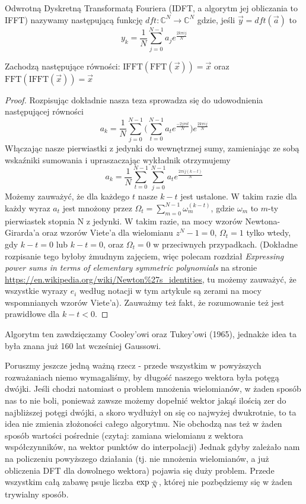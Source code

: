 \begin{definition}
    Odwrotną Dyskretną Transformatą Fouriera (IDFT, a algorytm jej obliczania to IFFT) nazywamy następującą funkcję $dft: \mathbb{C}^N \rightarrow \mathbb{C}^N$
    gdzie, jeśli $\vec{y} = dft(\vec{a})$ to $$y_k = \frac{1}{N}\sum_{j=0}^{N-1}a_je^{\frac{2k\pi ij}{N}}$$
\end{definition}

\begin{observation_small}
    Zachodzą następujące równości: $\text{IFFT}(\text{FFT}(\vec{x})) = \vec{x}$ oraz $\text{FFT}(\text{IFFT}(\vec{x})) = \vec{x}$
\end{observation_small}
\begin{proof}
    Rozpisując dokładnie nasza teza sprowadza się do udowodnienia następującej równości $$a_k = \frac{1}{N}\sum_{j=0}^{N-1}\Big(\sum_{t=0}^{N-1} a_t e^{\frac{-2j\pi i t}{N}} \Big) e^{\frac{2k\pi i j}{N}}$$
    Włączając nasze pierwiastki z jedynki do wewnętrznej sumy, zamieniając ze sobą wskaźniki sumowania i upraszaczając wykładnik otrzymujemy
    $$a_k = \frac{1}{N}\sum_{t=0}^{N-1}\sum_{j=0}^{N-1} a_t e^{\frac{2\pi i j(k-t)}{N}}$$
    Możemy zauważyć, że dla każdego $t$ nasze $k-t$ jest ustalone. W takim razie dla każdy wyraz $a_t$ jest mnożony przez $\Omega_t = \sum_{m=0}^{N-1}\omega_m^(k-t)$, gdzie $\omega_m$ to $m$-ty pierwiastek stopnia N z jedynki.
    W takim razie, na mocy wzorów Newtona-Girarda'a oraz wzorów Viete'a dla wielomianu $z^N - 1 = 0$, $\Omega_t = 1$ tylko wtedy, gdy $k-t = 0$ lub $k-t = 0$, oraz $\Omega_t = 0$ w przeciwnych przypadkach.
    (Dokładne rozpisanie tego byłoby żmudnym zajęciem, więc polecam rozdział \textit{Expressing power sums in terms of elementary symmetric polynomials} na stronie \url{https://en.wikipedia.org/wiki/Newton%27s_identities},
    tu możemy zauważyć, że wszystkie wyrazy $e_i$ według notacji w tym artykule są zerami na mocy wspomnianych wzorów Viete'a).
    Zauważmy też fakt, że rozumowanie też jest prawidłowe dla $k-t < 0$.
\end{proof}
Algorytm ten zawdzięczamy Cooley'owi oraz Tukey'owi (1965), jednakże idea ta była znana już 160 lat wcześniej Gaussowi.

Poruszmy jeszcze jedną ważną rzecz - przede wszystkim w powyższych rozważaniach niemo wymagaliśmy, by długość naszego wektora była potęgą dwójki. Jeśli chodzi natomiast o problem mnożenia wielomianów, w żaden sposób nas to nie boli, ponieważ zawsze możemy dopełnić wektor jakąś ilością zer do najbliższej potęgi dwójki, a skoro wydłużył on się co najwyżej dwukrotnie, to ta idea nie zmienia złożoności całego algorytmu.
Nie obchodzą nas też w żaden sposób wartości pośrednie (czytaj: zamiana wielomianu z wektora współczynników, na wektor punktów do interpolacji)
Jednak gdyby zależało nam na policzeniu powyższego działania (tj. nie mnożenia wielomianów, a już obliczenia DFT dla dowolnego wektora) pojawia się duży problem. Przede wszystkim całą zabawę psuje liczba $\exp{\frac{\mathunderscore}{N}}$, której nie pozbędziemy się w żaden trywialny sposób.


